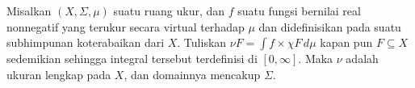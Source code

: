  Misalkan $(X,\Sigma,\mu)$ suatu ruang ukur,
dan $f$ suatu fungsi bernilai real nonnegatif yang terukur secara virtual
terhadap $\mu$ dan didefinisikan pada suatu subhimpunan koterabaikan dari
$X$. Tuliskan $\nu F=\int f\times\chi F\,d\mu$ kapan pun $F\subseteq X$
sedemikian sehingga integral tersebut terdefinisi di
$[0,\infty]$.
Maka $\nu$ adalah ukuran lengkap pada $X$, dan domainnya mencakup
$\Sigma$.

